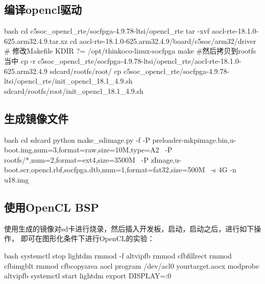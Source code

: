\subsection{编译opencl驱动}
\begin{code-block}{bash}
cd c5soc_opencl_rte/socfpga-4.9.78-ltsi/opencl_rte
tar -xvf aocl-rte-18.1.0-625.arm32.4.9.tar.xz
cd aocl-rte-18.1.0-625.arm32.4.9/board/c5soc/arm32/driver
# 修改Makefile
KDIR ?= /opt/thinkoco-linux-socfpga
make
#然后拷贝到rootfs当中
cp -r c5soc_opencl_rte/socfpga-4.9.78-ltsi/opencl_rte/aocl-rte-18.1.0-625.arm32.4.9 sdcard/rootfs/root/
cp c5soc_opencl_rte/socfpga-4.9.78-ltsi/opencl_rte/init_opencl_18.1_4.9.sh sdcard/rootfs/root/init_opencl_18.1_4.9.sh
\end{code-block}

\subsection{生成镜像文件}
\begin{code-block}{bash}
cd sdcard
python make_sdimage.py -f -P preloader-mkpimage.bin,u-boot.img,num=3,format=raw,size=10M,type=A2 \
    -P rootfs/*,num=2,format=ext4,size=3500M \
    -P zImage,u-boot.scr,opencl.rbf,socfpga.dtb,num=1,format=fat32,size=500M \
    -s 4G -n u18.img
\end{code-block}

\subsection{使用OpenCL BSP}
使用生成的镜像对sd卡进行烧录，然后插入开发板，启动，启动之后，进行如下操作，
即可在图形化条件下进行OpenCL的实验：
\begin{code-block}{bash}
systemctl stop lightdm
rmmod -f altvipfb
rmmod cfbfillrect
rmmod cfbimgblt
rmmod cfbcopyarea
aocl program /dev/acl0 yourtarget.aocx
modprobe altvipfb
systemctl start lightdm
export DISPLAY=:0
\end{code-block}
